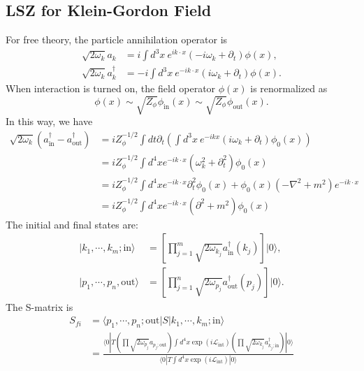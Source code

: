 \subsection{LSZ for Klein-Gordon Field}
For free theory, the particle annihilation operator is
\begin{equation}
\begin{aligned}
	\sqrt{2\omega_k} a_k &= i \int d^3 x\ e^{ik\cdot x}(-i\omega_k+\partial_t)\phi(x), \\
	\sqrt{2\omega_k} a^\dagger_k &= -i \int d^3 x\ e^{-ik\cdot x}(i\omega_k+\partial_t)\phi(x).
\end{aligned}
\end{equation}
When interaction is turned on, the field operator $\phi(x)$ is renormalized as
\begin{equation*}
	\phi(x) \sim \sqrt{Z_{\phi}} \phi_{\mathrm{in}}(x) \sim \sqrt{Z_{\phi}} \phi_{\mathrm{out}}(x).
\end{equation*}
In this way, we have
\begin{equation*}
\begin{aligned}
	\sqrt{2\omega_k}(a_{\mathrm{in}}^\dagger - a_{\mathrm{out}}^\dagger)
	&= i Z_\phi^{-1/2} \int dt \partial_t \left(\int d^{3}x\ e^{-ikx}(i\omega_k+\partial_t)\phi_0(x)\right) \\
	&= i Z_\phi^{-1/2} \int d^4 x e^{-ik\cdot x}(\omega_k^2+\partial_t^2)\phi_0(x) \\
	&= i Z_\phi^{-1/2} \int d^4 x e^{-ik\cdot x}\partial_t^2\phi_0(x) + \phi_0(x)(-\nabla^2+m^2)e^{-i k\cdot x} \\
	&= i Z_\phi^{-1/2} \int d^4 x e^{-ik\cdot x}(\partial^2+m^2)\phi_0(x)
\end{aligned}
\end{equation*}
The initial and final states are:
\begin{equation}
\begin{aligned}
	|k_1, \cdots, k_m; \mathrm{in}\rangle &= \left[\prod_{j=1}^m \sqrt{2\omega_{k_j}} a^\dagger_{\mathrm{in}}(k_j)\right] |0\rangle, \\
	|p_1, \cdots, p_n, \mathrm{out}\rangle &= \left[\prod_{j=1}^n \sqrt{2\omega_{p_j}}a^\dagger_{\mathrm{out}}(p_j)\right] |0\rangle.
\end{aligned}
\end{equation}
The S-matrix is
\begin{equation*}
\begin{aligned}
	S_{fi} &= \langle p_1, \cdots, p_n;\mathrm{out}| S |k_1, \cdots, k_m; \mathrm{in}\rangle \\
	&= \frac{\langle 0|T 
		\left(\prod \sqrt{2\omega_{p_j}} a_{p_j;\mathrm{out}} \right)
		\int d^4 x \exp(i\mathcal{L}_{\mathrm{int}})
		\left(\prod \sqrt{2\omega_{k_j}} a^\dagger_{k_j;\mathrm{in}} \right)|0\rangle}
		{\langle 0|T\int d^4 x \exp(i\mathcal{L}_{\mathrm{int}})|0\rangle}
\end{aligned}
\end{equation*}
